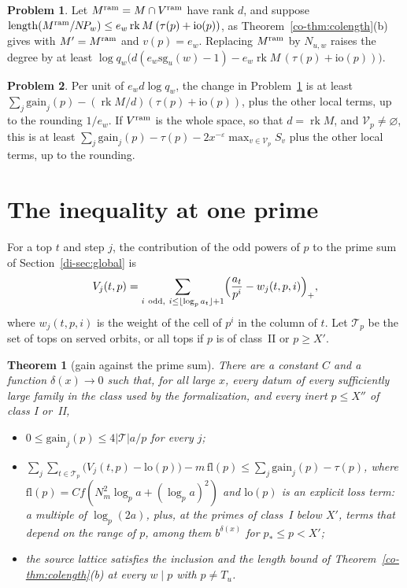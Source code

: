 \documentclass[reqno]{amsart}
\theoremstyle{definition}
\newtheorem{problem}{Problem}[section]
\theoremstyle{plain}
\newtheorem{theorem}{Theorem}[section]
\theoremstyle{remark}
\newcommand{\Tc}{\mathcal T}
\newcommand{\Vc}{\mathcal V}
\newcommand{\gain}{\mathrm{gain}}
\newcommand{\io}{\mathrm{io}}
\newcommand{\rk}{\operatorname{rk}}
\newcommand{\len}{\operatorname{length}}
\begin{document}
\begin{problem}\label{pr:record}
Let \(M^{\rm ram}=M\cap V^{\rm ram}\) have rank \(d\), and suppose \(\len(M^{\rm ram}/N\!P_w)\le e_w\rk M\,(\tau(p)+\io(p))\), as Theorem~\ref{co-thm:colength}(b) gives with \(M'=M^{\rm ram}\) and \(v(p)=e_w\).  Replacing \(M^{\rm ram}\) by \(N_{u,w}\) raises the degree by at least \(\log q_w\bigl(d(e_w\mathrm{sg}_u(w)-1)-e_w\rk M\,(\tau(p)+\io(p))\bigr)\).
\end{problem}

\begin{problem}\label{pr:net}
Per unit of \(e_wd\log q_w\), the change in Problem~\ref{pr:record} is at least \(\sum_j\gain_j(p)-(\rk M/d)(\tau(p)+\io(p))\), plus the other local terms, up to the rounding \(1/e_w\).  If \(V^{\rm ram}\) is the whole space, so that \(d=\rk M\), and \(\Vc_p\ne\varnothing\), this is at least \(\sum_j\gain_j(p)-\tau(p)-2x^{-\varepsilon}\max_{v\in\Vc_p}S_v\) plus the other local terms, up to the rounding.
\end{problem}

\section{The inequality at one prime}\label{sec:inequality}

For a top \(t\) and step \(j\), the contribution of the odd powers of \(p\) to the prime sum of Section~\ref{di-sec:global} is
\[
 V_j(t,p)=\sum_{i\ \text{odd},\ i\le\lfloor\log_pa_t\rfloor+1}\Bigl(\frac{a_t}{p^i}-w_j(t,p,i)\Bigr)_+ ,
\]
where \(w_j(t,p,i)\) is the weight of the cell of \(p^i\) in the column of \(t\).  Let \(\Tc_p\) be the set of tops on served orbits, or all tops if \(p\) is of class~II or \(p\ge X'\).

\begin{theorem}[gain against the prime sum]\label{thm:linkG}
There are a constant \(C\) and a function \(\delta(x)\to0\) such that, for all large \(x\), every datum of every sufficiently large family in the class used by the formalization, and every inert \(p\le X''\) of class I or~II,
\begin{itemize}
\item[(i)] \(0\le\gain_j(p)\le4\lvert\Tc\rvert a/p\) for every \(j\);
\item[(ii)] \(\sum_j\sum_{t\in\Tc_p}\bigl(V_j(t,p)-\mathrm{lo}(p)\bigr)-m\,\mathrm{fl}(p)\le\sum_j\gain_j(p)-\tau(p)\), where \(\mathrm{fl}(p)=Cf(N_m^2\log_pa+(\log_pa)^2)\) and \(\mathrm{lo}(p)\) is an explicit loss term: a multiple of \(\log_p(2a)\), plus, at the primes of class~I below \(X'\), terms that depend on the range of \(p\), among them \(b^{\delta(x)}\) for \(p_*\le p<X'\);
\item[(iii)] the source lattice satisfies the inclusion and the length bound of Theorem~\ref{co-thm:colength}(b) at every \(w\mid p\) with \(p\ne T_u\).
\end{itemize}
\end{theorem}
\end{document}
